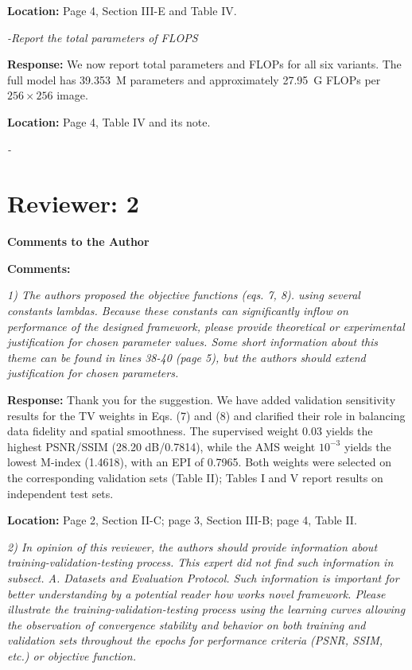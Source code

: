 \documentclass[11pt,letterpaper]{article}
\begin{document}
\textbf{Location:} Page 4, Section III-E and Table IV.

\textit{-Report the total parameters of FLOPS}

\textbf{Response:} We now report total parameters and FLOPs for all six variants. The full model has 39.353~M parameters and approximately 27.95~G FLOPs per \(256\times256\) image.

\textbf{Location:} Page 4, Table IV and its note.

\textit{-}

\section*{Reviewer: 2}
\textbf{Comments to the Author}\par
\textbf{Comments:}

\textit{1) The authors proposed the objective functions (eqs. 7, 8). using several constants lambdas. Because these constants can significantly inflow on performance of the designed framework, please provide theoretical or experimental justification for chosen parameter values. Some short information about this theme can be found in lines 38-40 (page 5), but the authors should extend justification for chosen parameters.}

\medskip
\textbf{Response:} Thank you for the suggestion. We have added validation sensitivity results for the TV weights in Eqs. (7) and (8) and clarified their role in balancing data fidelity and spatial smoothness. The supervised weight 0.03 yields the highest PSNR/SSIM (28.20 dB/0.7814), while the AMS weight \(10^{-3}\) yields the lowest M-index (1.4618), with an EPI of 0.7965. Both weights were selected on the corresponding validation sets (Table II); Tables I and V report results on independent test sets.

\textbf{Location:} Page 2, Section II-C; page 3, Section III-B; page 4, Table II.

\textit{2) In opinion of this reviewer, the authors should provide information about training-validation-testing process. This expert did not find such information in subsect. A. Datasets and Evaluation Protocol. Such information is important for better understanding by a potential reader how works novel framework. Please illustrate the training-validation-testing process using the learning curves allowing the observation of convergence stability and behavior on both training and validation sets throughout the epochs for performance criteria (PSNR, SSIM, etc.) or objective function.}
\end{document}
